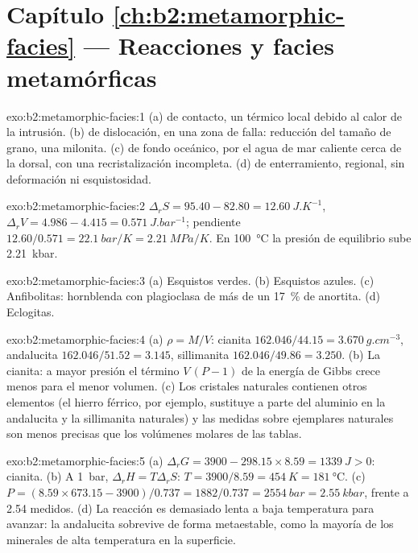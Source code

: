 \section*{Capítulo \ref{ch:b2:metamorphic-facies} --- Reacciones y facies metamórficas}

\begin{solution}{exo:b2:metamorphic-facies:1}
(a)  de contacto, un  térmico local debido al calor de la intrusión.
(b)  de dislocación, en una zona de falla: reducción del tamaño de grano, una milonita.
(c)  de fondo oceánico, por el agua de mar caliente cerca de la dorsal, con una
recristalización incompleta. (d)  de enterramiento, regional, sin deformación ni
esquistosidad.
\end{solution}

\begin{solution}{exo:b2:metamorphic-facies:2}
$\Delta_r S = 95.40 - 82.80 = \qty{12.60}{J.K^{-1}}$, $\Delta_r V = 4.986 - 4.415 =
\qty{0.571}{J.bar^{-1}}$; pendiente $12.60/0.571 = \qty{22.1}{bar/K} = \qty{2.21}{MPa/K}$.
En \qty{100}{\celsius} la presión de equilibrio sube \qty{2.21}{kbar}.
\end{solution}

\begin{solution}{exo:b2:metamorphic-facies:3}
(a) Esquistos verdes. (b) Esquistos azules. (c) Anfibolitas: hornblenda con plagioclasa de más
de un \qty{17}{\percent} de anortita. (d) Eclogitas.
\end{solution}

\begin{solution}{exo:b2:metamorphic-facies:4}
(a) $\rho = M/V$: cianita $162.046/44.15 = \qty{3.670}{g.cm^{-3}}$, andalucita
$162.046/51.52 = 3.145$, sillimanita $162.046/49.86 = 3.250$. (b) La cianita: a mayor
presión el término $V\,(P - 1)$ de la energía de Gibbs crece menos para el menor volumen.
(c) Los cristales naturales contienen otros elementos (el hierro férrico, por ejemplo, sustituye a parte del
aluminio en la andalucita y la sillimanita naturales) y las medidas sobre ejemplares
naturales son menos precisas que los volúmenes molares de las tablas.
\end{solution}

\begin{solution}{exo:b2:metamorphic-facies:5}
(a) $\Delta_r G = 3900 - 298.15\times8.59 = \qty{+1339}{J} > 0$: cianita. (b) A
\qty{1}{bar}, $\Delta_r H = T\Delta_r S$: $T = 3900/8.59 = \qty{454}{K} =
\qty{181}{\celsius}$. (c) $P = (8.59\times673.15 - 3900)/0.737 = 1882/0.737 =
\qty{2554}{bar} = \qty{2.55}{kbar}$, frente a 2.54 medidos. (d) La reacción es demasiado lenta
a baja temperatura para avanzar: la andalucita sobrevive de forma metaestable, como la mayoría de los minerales
de alta temperatura en la superficie.
\end{solution}


